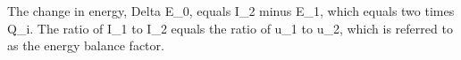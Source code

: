 The change in energy, Delta E_0, equals I_2 minus E_1, which equals two times Q_i. The ratio of I_1 to I_2 equals the ratio of u_1 to u_2, which is referred to as the energy balance factor.